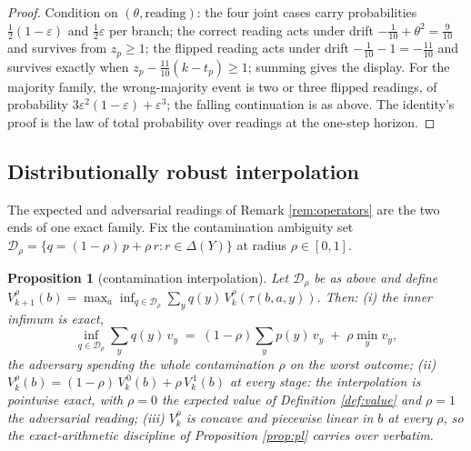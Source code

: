 \documentclass[10pt,twocolumn]{article}
\theoremstyle{plain}
\newtheorem{proposition}[theorem]{Proposition}
\theoremstyle{definition}
\theoremstyle{remark}
\begin{document}
\begin{proof}
Condition on \((\theta, \text{reading})\): the four joint cases carry
probabilities \(\tfrac12(1-\varepsilon)\) and \(\tfrac12\varepsilon\)
per branch; the correct reading acts under drift
\(-\tfrac1{10} + \theta^{2} = \tfrac9{10}\) and survives from
\(z_{p} \ge 1\); the flipped reading acts under drift
\(-\tfrac1{10} - 1 = -\tfrac{11}{10}\) and survives exactly when
\(z_{p} - \tfrac{11}{10}(k - t_{p}) \ge 1\); summing gives the
display. For the majority family, the wrong-majority event is two or
three flipped readings, of probability
\(3\varepsilon^{2}(1-\varepsilon) + \varepsilon^{3}\); the falling
continuation is as above. The identity's proof is the law of total
probability over readings at the one-step horizon.
\end{proof}

\subsection{Distributionally robust interpolation}\label{dr}

The expected and adversarial readings of Remark \ref{rem:operators} are
the two ends of one exact family. Fix the contamination ambiguity set
\(\mathcal{D}_{\rho} = \{q = (1 - \rho)\,p + \rho\, r : r \in
\Delta(Y)\}\) at radius \(\rho \in [0, 1]\).

\begin{proposition}[contamination interpolation]\label{prop:dr}
Let \(\mathcal{D}_{\rho}\) be as above and define
\(V^{\rho}_{k+1}(b) = \max_{a}\inf_{q \in \mathcal{D}_{\rho}}
\sum_{y} q(y)\, V^{\rho}_{k}(\tau(b, a, y))\). Then:
(i) the inner infimum is exact,
\[
\inf_{q \in \mathcal{D}_{\rho}} \textstyle\sum_{y} q(y)\, v_{y}
\;=\; (1 - \rho) \sum_{y} p(y)\, v_{y} \;+\; \rho \min_{y} v_{y},
\]
the adversary spending the whole contamination \(\rho\) on the worst
outcome;
(ii) \(V^{\rho}_{k}(b) = (1 - \rho)\, V^{\,0}_{k}(b) + \rho\,
V^{\,1}_{k}(b)\) at every stage: the interpolation is pointwise exact,
with \(\rho = 0\) the expected value of Definition \ref{def:value}
and \(\rho = 1\) the adversarial reading;
(iii) \(V^{\rho}_{k}\) is concave and piecewise linear in \(b\) at
every \(\rho\), so the exact-arithmetic discipline of Proposition
\ref{prop:pl} carries over verbatim.
\end{proposition}
\end{document}
